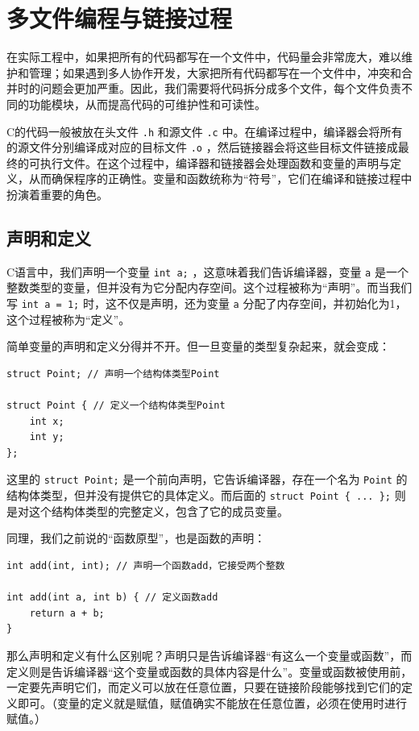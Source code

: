 \section{多文件编程与链接过程}

在实际工程中，如果把所有的代码都写在一个文件中，代码量会非常庞大，难以维护和管理；如果遇到多人协作开发，大家把所有代码都写在一个文件中，冲突和合并时的问题会更加严重。因此，我们需要将代码拆分成多个文件，每个文件负责不同的功能模块，从而提高代码的可维护性和可读性。

C的代码一般被放在头文件 \verb|.h| 和源文件 \verb|.c| 中。在编译过程中，编译器会将所有的源文件分别编译成对应的目标文件 \verb|.o| ，然后链接器会将这些目标文件链接成最终的可执行文件。在这个过程中，编译器和链接器会处理函数和变量的声明与定义，从而确保程序的正确性。变量和函数统称为“符号”，它们在编译和链接过程中扮演着重要的角色。

\subsection{声明和定义}

C语言中，我们声明一个变量 \texttt{int a;} ，这意味着我们告诉编译器，变量 \verb|a| 是一个整数类型的变量，但并没有为它分配内存空间。这个过程被称为“声明”。而当我们写 \texttt{int a = 1;} 时，这不仅是声明，还为变量 \verb|a| 分配了内存空间，并初始化为1，这个过程被称为“定义”。

简单变量的声明和定义分得并不开。但一旦变量的类型复杂起来，就会变成：
\begin{verbatim}
struct Point; // 声明一个结构体类型Point

struct Point { // 定义一个结构体类型Point
    int x;
    int y;
};
\end{verbatim}
这里的 \verb|struct Point;| 是一个前向声明，它告诉编译器，存在一个名为 \verb|Point| 的结构体类型，但并没有提供它的具体定义。而后面的 \verb|struct Point { ... };| 则是对这个结构体类型的完整定义，包含了它的成员变量。

同理，我们之前说的“函数原型”，也是函数的声明：
\begin{verbatim}
int add(int, int); // 声明一个函数add，它接受两个整数

int add(int a, int b) { // 定义函数add
    return a + b;
}
\end{verbatim}

那么声明和定义有什么区别呢？声明只是告诉编译器“有这么一个变量或函数”，而定义则是告诉编译器“这个变量或函数的具体内容是什么”。变量或函数被使用前，一定要先声明它们，而定义可以放在任意位置，只要在链接阶段能够找到它们的定义即可。（变量的定义就是赋值，赋值确实不能放在任意位置，必须在使用时进行赋值。）


